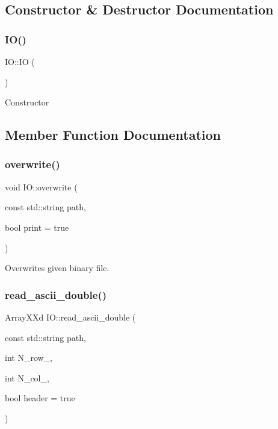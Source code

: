 \subsection{Constructor \& Destructor Documentation}
\mbox{\label{class_i_o_a49b27a2ee79bce0de4e3ef163cbebd30}} 
\subsubsection{\texorpdfstring{I\+O()}{IO()}}
{\footnotesize\ttfamily I\+O\+::\+IO (\begin{DoxyParamCaption}{ }\end{DoxyParamCaption})}

Constructor 

\subsection{Member Function Documentation}
\mbox{\label{class_i_o_a0fd7211866348cd3acc26d1ed17c100c}} 
\subsubsection{\texorpdfstring{overwrite()}{overwrite()}}
{\footnotesize\ttfamily void I\+O\+::overwrite (\begin{DoxyParamCaption}\item[{const std\+::string}]{path,  }\item[{bool}]{print = {\ttfamily true} }\end{DoxyParamCaption})}

Overwrites given binary file.\mbox{\label{class_i_o_a3ddd4b5d95a8a5cfffb56cfcf7c186e1}} 
\subsubsection{\texorpdfstring{read\+\_\+ascii\+\_\+double()}{read\_ascii\_double()}}
{\footnotesize\ttfamily Array\+X\+Xd I\+O\+::read\+\_\+ascii\+\_\+double (\begin{DoxyParamCaption}\item[{const std\+::string}]{path,  }\item[{int}]{N\+\_\+row\+\_\+,  }\item[{int}]{N\+\_\+col\+\_\+,  }\item[{bool}]{header = {\ttfamily true} }\end{DoxyParamCaption})}

